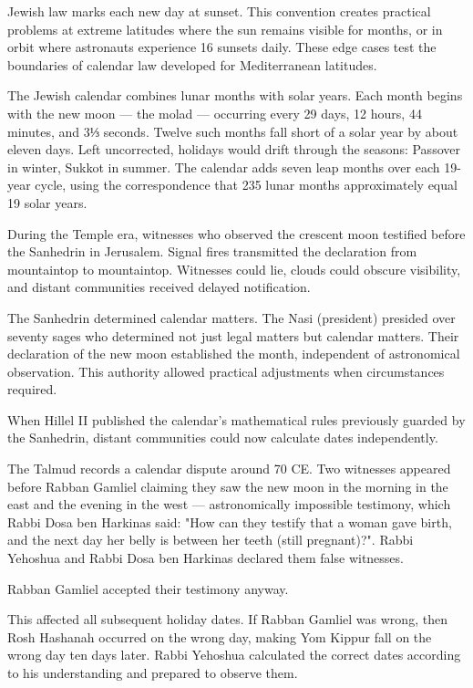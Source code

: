 Jewish law marks each new day at sunset. This convention creates practical problems at extreme latitudes where the sun remains visible for months, or in orbit where astronauts experience 16 sunsets daily. These edge cases test the boundaries of calendar law developed for Mediterranean latitudes.

The Jewish calendar combines lunar months with solar years. Each month begins with the new moon — the molad — occurring every 29 days, 12 hours, 44 minutes, and 3⅓ seconds. Twelve such months fall short of a solar year by about eleven days. Left uncorrected, holidays would drift through the seasons: Passover in winter, Sukkot in summer. The calendar adds seven leap months over each 19-year cycle, using the correspondence that 235 lunar months approximately equal 19 solar years.

During the Temple era, witnesses who observed the crescent moon testified before the Sanhedrin in Jerusalem. Signal fires transmitted the declaration from mountaintop to mountaintop. Witnesses could lie, clouds could obscure visibility, and distant communities received delayed notification.

The Sanhedrin determined calendar matters. The Nasi (president) presided over seventy sages who determined not just legal matters but calendar matters. Their declaration of the new moon established the month, independent of astronomical observation. This authority allowed practical adjustments when circumstances required.

When Hillel II published the calendar's mathematical rules previously guarded by the Sanhedrin, distant communities could now calculate dates independently. 

The Talmud records a calendar dispute around 70 CE. Two witnesses appeared before Rabban Gamliel claiming they saw the new moon in the morning in the east and the evening in the west — astronomically impossible testimony, which Rabbi Dosa ben Harkinas said: "How can they testify that a woman gave birth, and the next day her belly is between her teeth (still pregnant)?". Rabbi Yehoshua and Rabbi Dosa ben Harkinas declared them false witnesses.

Rabban Gamliel accepted their testimony anyway.

This affected all subsequent holiday dates. If Rabban Gamliel was wrong, then Rosh Hashanah occurred on the wrong day, making Yom Kippur fall on the wrong day ten days later. Rabbi Yehoshua calculated the correct dates according to his understanding and prepared to observe them.

